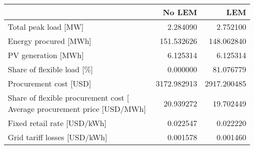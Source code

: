 \begin{tabular}{lrr}
\toprule
{} &       No LEM &          LEM \\
\midrule
Total peak load [MW]                   &     2.284090 &     2.752100 \\
Energy procured [MWh]                  &   151.532626 &   148.062840 \\
PV generation [MWh]                    &     6.125314 &     6.125314 \\
Share of flexible load [\%]            &     0.000000 &    81.076779 \\
Procurement cost [USD]                 &  3172.982913 &  2917.200485 \\
Share of flexible procurement cost [%
Average procurement price [USD/MWh]    &    20.939272 &    19.702449 \\
Fixed retail rate [USD/kWh]            &     0.022547 &     0.022220 \\
Grid tariff losses [USD/kWh]           &     0.001578 &     0.001460 \\
\bottomrule
\end{tabular}
